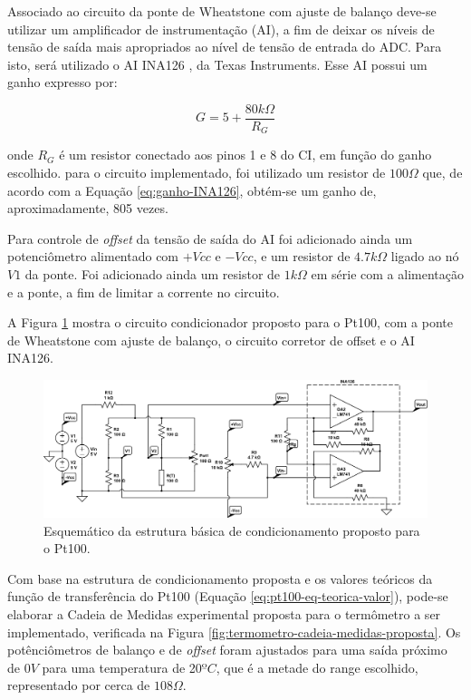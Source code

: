 \documentclass[a4paper]{instrumentacao}
\begin{document}
Associado ao circuito da ponte de Wheatstone com ajuste de balanço deve-se utilizar um amplificador de instrumentação (AI), a fim de deixar os níveis de tensão de saída mais apropriados ao nível de tensão de entrada do ADC. Para isto, será utilizado o AI INA126 \cite{datasheet-INA126}, da Texas Instruments. Esse AI possui um ganho expresso por:

 \begin{equation}
	G=5+\frac{80k\Omega}{R_G}
	\label{eq:ganho-INA126}
\end{equation}

\noindent onde $R_G$ é um resistor conectado aos pinos 1 e 8 do CI, em função do ganho escolhido. para o circuito implementado, foi utilizado um resistor de $100\Omega$ que, de acordo com a Equação \ref{eq:ganho-INA126}, obtém-se um ganho de, aproximadamente, 805 vezes.

Para controle de \textit{offset} da tensão de saída do AI foi adicionado ainda um potenciômetro alimentado com $+Vcc$ e $-Vcc$, e um resistor de $4.7k\Omega$ ligado ao nó $V1$ da ponte. Foi adicionado ainda um resistor de $1k\Omega$ em série com a alimentação e a ponte, a fim de limitar a corrente no circuito.

A Figura \ref{fig:termometro-ckt-condicionador-completo} mostra o circuito condicionador proposto para o Pt100, com a ponte de Wheatstone com ajuste de balanço, o circuito corretor de offset e o AI INA126.

\begin{figure}[H]
	\centering \includegraphics[width=\textwidth]{pt100-condicionamento-completo.png}
	\caption{Esquemático da estrutura básica de condicionamento proposto para o Pt100.}
	\label{fig:termometro-ckt-condicionador-completo}
\end{figure}

Com base na estrutura de condicionamento proposta e os valores teóricos da função de transferência do Pt100 (Equação \ref{eq:pt100-eq-teorica-valor}), pode-se elaborar a Cadeia de Medidas experimental proposta para o termômetro a ser implementado, verificada na Figura \ref{fig:termometro-cadeia-medidas-proposta}. Os potênciômetros de balanço e de \textit{offset} foram ajustados para uma saída próximo de $0V$ para uma temperatura de 20$ºC$, que é a metade do range escolhido, representado por cerca de $108\Omega$.
\end{document}
